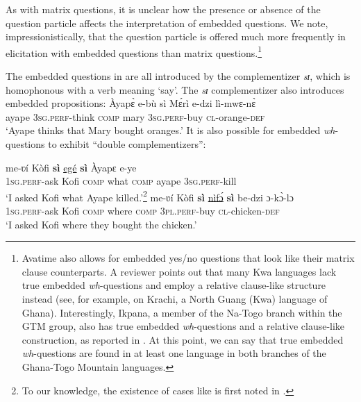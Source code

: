 \documentclass[output=paper]{langscibook}
\begin{document}
As with matrix questions, it is unclear how the presence or absence of the question particle affects the interpretation of embedded questions. We note, impressionistically, that the question particle is offered much more frequently in elicitation with embedded questions than matrix questions.\footnote{Avatime also allows for embedded yes/no questions that look like their matrix clause counterparts. A reviewer points out that many Kwa languages lack true embedded \textit{wh}-questions and employ a relative clause-like structure instead (see, for example, \citealt{torrence2015wh} on Krachi, a North Guang (Kwa) language of Ghana). Interestingly, Ikpana, a member of the Na-Togo branch within the GTM group, also has true embedded \textit{wh}-questions and a relative clause-like construction, as reported in \citet{ikpana}. At this point, we can say that true embedded \textit{wh}-questions are found in at least one language in both branches of the Ghana-Togo Mountain languages.} 


The embedded questions in  are all introduced by the complementizer \textit{sɪ}, which is homophonous with a verb meaning `say’. The \textit{sɪ} complementizer also introduces embedded propositions:
\ea \label{ex:devlin:si-proposition}
\gll  \`{A}yap\`{ɛ} e-b\`{u} s\`{i} M\'{ɛ}r\`{i} e-dzi l\`{i}-mwɛ-n\`{ɛ}\\
ayape \textsc{3sg.perf}-think \textsc{comp} mary \textsc{3sg.perf}-buy \textsc{cl}-orange-\textsc{def}\\
\glt `Ayape thinks that Mary bought oranges.’
\z 
\noindent It is also possible for embedded \textit{wh}-questions to exhibit ``double complementizers”:
\ea\label{ex:devlin:double-comp}
\begin{xlist}
\ex \label{ex:devlin:double-comp-a}
\gll me-ʋ\'{i} K\`{o}fi \textbf{s\`{i}} \uline{eg\'{e}} \textbf{s\`{i}} \`{A}yapɛ e-ye\\
\textsc{1sg.perf}-ask Kofi \textsc{comp} what \textsc{comp} ayape \textsc{3sg.perf}-kill \\
\glt `I asked Kofi  what Ayape killed.’\footnote{To our knowledge, the existence of cases like  is first noted in \citet[113]{van2014information}.}
\ex
\gll  me-ʋ\'{i} K\`{o}fi \textbf{s\`{i}} \uline{n\`{i}f\'{ɔ}} \textbf{s\`{i}} be-dzi ɔ-k\`{ɔ}-lɔ\\
\textsc{1sg.perf}-ask Kofi \textsc{comp} where \textsc{comp} 	\textsc{3pl.perf}-buy \textsc{cl}-chicken-\textsc{def}  \\
\glt `I asked Kofi where they bought the chicken.’
\end{xlist}
\z
\end{document}
